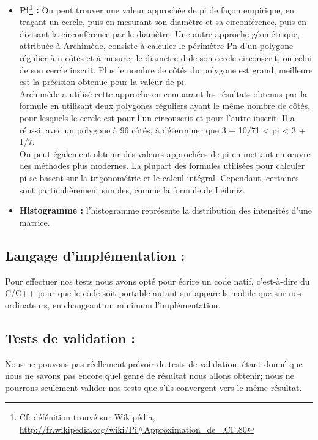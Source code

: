 \begin{itemize}
	\newpage
	\item{ \textbf{Pi\footnote{Cf: défénition trouvé sur Wikipédia, \url{http://fr.wikipedia.org/wiki/Pi#Approximation_de_.CF.80}} :} On peut trouver une valeur approchée de pi de façon empirique, en traçant un cercle, puis en mesurant son diamètre et sa circonférence, puis en divisant la circonférence par le diamètre. Une autre approche géométrique, attribuée à Archimède, consiste à calculer le périmètre Pn d’un polygone régulier à n côtés et à mesurer le diamètre d de son cercle circonscrit, ou celui de son cercle inscrit. Plus le nombre de côtés du polygone est grand, meilleure est la précision obtenue pour la valeur de pi.\\
	Archimède a utilisé cette approche en comparant les résultats obtenus par la formule en utilisant deux polygones réguliers ayant le même nombre de côtés, pour lesquels le cercle est pour l’un circonscrit et pour l’autre inscrit. Il a réussi, avec un polygone à 96 côtés, à déterminer que 3 + 10/71 < pi < 3 + 1/7.\\
	On peut également obtenir des valeurs approchées de pi en mettant en œuvre des méthodes plus modernes. La plupart des formules utilisées pour calculer pi se basent sur la trigonométrie et le calcul intégral. Cependant, certaines sont particulièrement simples, comme la formule de Leibniz. \\}

	\item{ \textbf{Histogramme :} l’histogramme représente la distribution des intensités d'une matrice.}
	\end{itemize}

	\subsection*{Langage d'implémentation :}
		Pour effectuer nos tests nous avons opté pour écrire un code natif, c'est-à-dire du C/C++ pour que le code soit portable autant sur appareils mobile que sur nos ordinateurs, en changeant un minimum l'implémentation. 

	\subsection*{Tests de validation :}
		Nous ne pouvons pas réellement prévoir de tests de validation, étant donné que nous ne savons pas encore quel genre de résultat nous allons obtenir; nous ne pourrons seulement valider nos tests que s'ils convergent vers le même résultat. 

